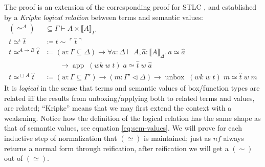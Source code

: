 \documentclass{article}
\theoremstyle{definition}\newtheorem{definition}{Definition}
\begin{document}
The proof is an extension of the corresponding proof for STLC \cite{kovacs17},
and established by a \emph{Kripke logical relation} \cite{plotkin73}
between terms and semantic values:
\begin{align*}
  (\simeq^A) &\subseteq \Gamma \vdash A \times \llbracket A \rrbracket_\Gamma \\
  t \simeq^\iota \hat t &\coloneqq t \sim \ulcorner \hat t \urcorner \\
  t \simeq^{A \to B} \hat t &\coloneqq (w : \Gamma \subseteq \Delta) \to \forall a : \Delta \vdash A, \hat a : \llbracket A \rrbracket_\Delta.\, a \simeq \hat a \\
  &\qquad \to \operatorname{app} \; (\textit{wk} \; w \; t) \; a \simeq \hat t \; w \; \hat a \\
  t \simeq^{\Box A} \hat t &\coloneqq (w : \Gamma \subseteq \Gamma') \to (m : \Gamma' \lhd \Delta)
  \to \operatorname{unbox} \; (\textit{wk} \; w \; t) \; m \simeq \hat t \; w \; m
\end{align*}
It is \emph{logical} in the sense that terms and semantic values of box/function types
are related iff the results from unboxing/applying both to related terms and values, are related;
``Kripke'' means that we may first extend the context with a weakening.
Notice how the definition of the logical relation has the same shape
as that of semantic values, see equation \eqref{eq:sem-values}.
We will prove for each inductive step of normalization that $(\simeq)$ is maintained;
just as $\textit{nf}$ always returns a normal form through reification,
after reification we will get a $(\sim)$ out of $(\simeq)$.
\end{document}
